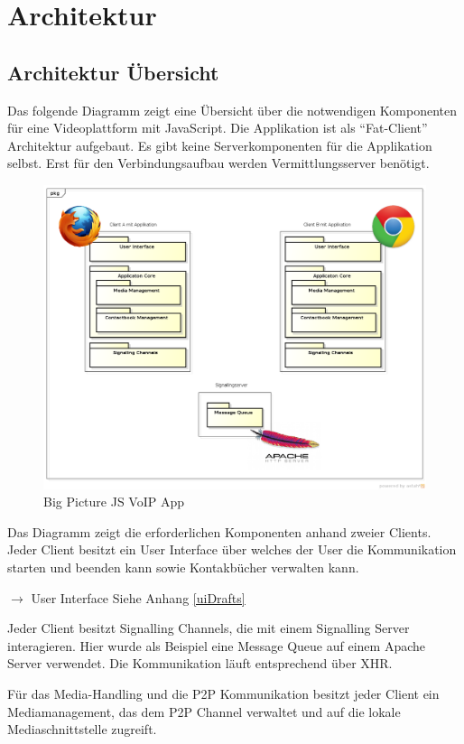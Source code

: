 \chapter{Architektur}

\section{Architektur Übersicht}
	Das folgende Diagramm zeigt eine Übersicht über die notwendigen Komponenten für eine Videoplattform mit JavaScript. Die Applikation ist als ``Fat-Client'' Architektur aufgebaut. Es gibt keine Serverkomponenten für die Applikation selbst. Erst für den Verbindungsaufbau werden Vermittlungsserver benötigt.
	\begin{figure}[H]
		\centering
		\includegraphics[width=1\textwidth]{../architekturanalayse/img/bigPicture.png}
		\caption{Big Picture JS VoIP App}
	\end{figure}
	Das Diagramm zeigt die erforderlichen Komponenten anhand zweier Clients. Jeder Client besitzt ein User Interface über welches der User die Kommunikation starten und beenden kann sowie Kontakbücher verwalten kann.
	
	$\rightarrow$ User Interface Siehe Anhang \ref{uiDrafts}
	
	Jeder Client besitzt Signalling Channels, die mit einem Signalling Server interagieren. Hier wurde als Beispiel eine Message Queue auf einem Apache Server verwendet. Die Kommunikation läuft entsprechend über XHR.
	
	Für das Media-Handling und die P2P Kommunikation besitzt jeder Client ein Mediamanagement, das dem P2P Channel verwaltet und auf die lokale Mediaschnittstelle zugreift.
	

